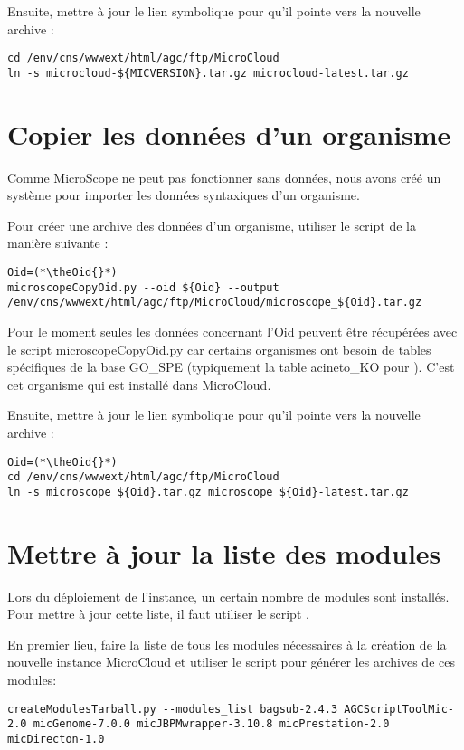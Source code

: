 Ensuite, mettre à jour le lien symbolique pour qu'il pointe vers la nouvelle archive :
\begin{lstlisting}[style=bash]
cd /env/cns/wwwext/html/agc/ftp/MicroCloud
ln -s microcloud-${MICVERSION}.tar.gz microcloud-latest.tar.gz
\end{lstlisting}

\section{Copier les données d'un organisme} \label{sec:nouvelle_donne_organisme}

Comme MicroScope ne peut pas fonctionner sans données, nous avons créé un système
pour importer les données syntaxiques d'un organisme.

Pour créer une archive des données d'un organisme, utiliser le script  de la manière suivante :
\begin{lstlisting}[style=bash]
Oid=(*\theOid{}*)
microscopeCopyOid.py --oid ${Oid} --output /env/cns/wwwext/html/agc/ftp/MicroCloud/microscope_${Oid}.tar.gz
\end{lstlisting}

\begin{warningbox}
    Pour le moment seules les données concernant l'Oid \theOid{} peuvent être récupérées avec le script microscopeCopyOid.py car certains organismes ont besoin de tables spécifiques de la base GO\_SPE (typiquement la table acineto\_KO pour \theOrg{}).
    C'est cet organisme qui est installé dans MicroCloud.
\end{warningbox}

Ensuite, mettre à jour le lien symbolique pour qu'il pointe vers la nouvelle archive :
\begin{lstlisting}[style=bash]
Oid=(*\theOid{}*)
cd /env/cns/wwwext/html/agc/ftp/MicroCloud
ln -s microscope_${Oid}.tar.gz microscope_${Oid}-latest.tar.gz
\end{lstlisting}

\section{Mettre à jour la liste des modules} \label{sec:nouvelle_liste_modules}

Lors du déploiement de l'instance, un certain nombre de modules sont installés.
Pour mettre à jour cette liste, il faut utiliser le script .

En premier lieu, faire la liste de tous les modules nécessaires à la création de la nouvelle instance MicroCloud et utiliser
le script  pour générer les archives de ces modules:
\begin{lstlisting}[style=bash]
createModulesTarball.py --modules_list bagsub-2.4.3 AGCScriptToolMic-2.0 micGenome-7.0.0 micJBPMwrapper-3.10.8 micPrestation-2.0 micDirecton-1.0
\end{lstlisting}

